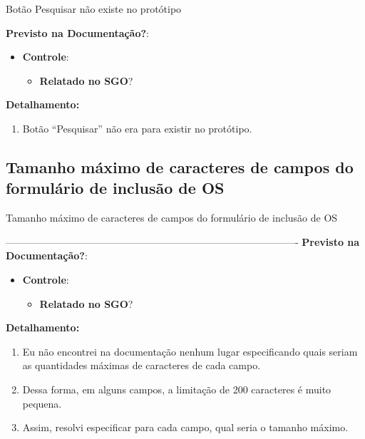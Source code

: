 \begin{falha}[1]{Botão Pesquisar não existe no protótipo}
	
	
	\textbf{Previsto na Documentação?}: \mschecksim
	\begin{itemize}
		
		\item \textbf{Controle}:
		\begin{itemize}
			\item \textbf{Relatado no SGO}? \mschecksim 
		\end{itemize}
	\end{itemize}
	
	\tcblower
	
	\textbf{Detalhamento:}
	\begin{enumerate}
		\item Botão ``Pesquisar'' não era para existir no protótipo.
	\end{enumerate}
\end{falha}

\subsection{Tamanho máximo de caracteres de campos do formulário de inclusão de OS}

\begin{falha}[1]{Tamanho máximo de caracteres de campos do formulário de inclusão de OS}
	
	
----------------------------------------------------------------------------------------
	\textbf{Previsto na Documentação?}: \mschecknao
	\begin{itemize}
		\item \textbf{Controle}:
		\begin{itemize}
			\item \textbf{Relatado no SGO}? \mschecksim
		\end{itemize}
	\end{itemize}
	
	\tcblower
	
	\textbf{Detalhamento:}
	\begin{enumerate}
		\item Eu não encontrei na documentação nenhum lugar especificando quais seriam as quantidades máximas de caracteres de cada campo.
		\item Dessa forma, em alguns campos, a limitação de 200 caracteres é muito pequena.
		\item Assim, resolvi especificar para cada campo, qual seria o tamanho máximo.
	\end{enumerate}


\end{falha}



